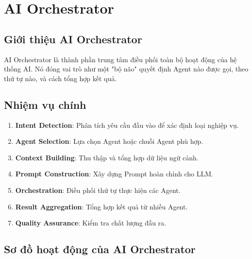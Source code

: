 \documentclass[12pt,a4paper]{report}
\begin{document}
\section{AI Orchestrator}

\subsection{Giới thiệu AI Orchestrator}

AI Orchestrator là thành phần trung tâm điều phối toàn bộ hoạt động của hệ thống AI. Nó đóng vai trò như một "bộ não" quyết định Agent nào được gọi, theo thứ tự nào, và cách tổng hợp kết quả.

\subsection{Nhiệm vụ chính}

\begin{enumerate}
\item \textbf{Intent Detection}: Phân tích yêu cầu đầu vào để xác định loại nghiệp vụ.
\item \textbf{Agent Selection}: Lựa chọn Agent hoặc chuỗi Agent phù hợp.
\item \textbf{Context Building}: Thu thập và tổng hợp dữ liệu ngữ cảnh.
\item \textbf{Prompt Construction}: Xây dựng Prompt hoàn chỉnh cho LLM.
\item \textbf{Orchestration}: Điều phối thứ tự thực hiện các Agent.
\item \textbf{Result Aggregation}: Tổng hợp kết quả từ nhiều Agent.
\item \textbf{Quality Assurance}: Kiểm tra chất lượng đầu ra.
\end{enumerate}

\subsection{Sơ đồ hoạt động của AI Orchestrator}
\end{document}
